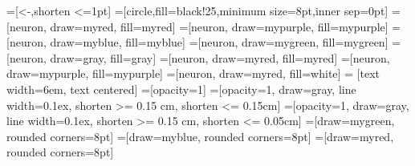 =[<-,shorten <=1pt]
=[circle,fill=black!25,minimum size=8pt,inner sep=0pt]
=[neuron, draw=myred, fill=myred]
=[neuron, draw=mypurple, fill=mypurple]
=[neuron, draw=myblue, fill=myblue]
=[neuron, draw=mygreen, fill=mygreen]
=[neuron, draw=gray, fill=gray]
=[neuron, draw=myred, fill=myred]
=[neuron, draw=mypurple, fill=mypurple]
=[neuron, draw=myred, fill=white]
 = [text width=6em, text centered]
=[opacity=1]
=[opacity=1, draw=gray, line width=0.1ex, shorten >= 0.15 cm, shorten <= 0.15cm]
=[opacity=1, draw=gray, line width=0.1ex, shorten >= 0.15 cm, shorten <= 0.05cm]
=[draw=mygreen, rounded corners=8pt]
=[draw=myblue, rounded corners=8pt]
=[draw=myred, rounded corners=8pt]

